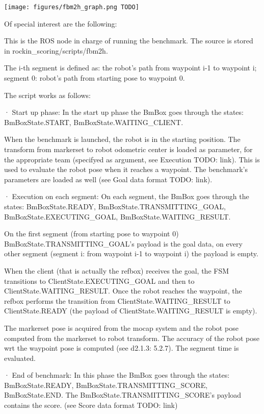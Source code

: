 \documentclass[a4paper]{article}
\begin{document}
\texttt{[image: figures/fbm2h\_graph.png TODO]}

Of special interest are the following:


This is the ROS node in charge of running the benchmark.
The source is stored in rockin_scoring/scripts/fbm2h.

The i-th segment is defined as: the robot's path from waypoint i-1 to waypoint i; segment 0: robot's path from starting pose to waypoint 0.

The script works as follows:

· Start up phase:
In the start up phase the BmBox goes through the states: BmBoxState.START, BmBoxState.WAITING_CLIENT.

When the benchmark is launched, the robot is in the starting position.
The transform from markerset to robot odometric center is loaded as parameter, for the appropriate team (specifyed as argument, see Execution TODO: link).
This is used to evaluate the robot pose when it reaches a waypoint.
The benchmark's parameters are loaded as well (see Goal data format TODO: link).

· Execution on each segment:
On each segment, the BmBox goes through the states: BmBoxState.READY, BmBoxState.TRANSMITTING_GOAL, BmBoxState.EXECUTING_GOAL, BmBoxState.WAITING_RESULT.

On the first segment (from starting pose to waypoint 0) BmBoxState.TRANSMITTING_GOAL's payload is the goal data, on every other segment (segment i: from waypoint i-1 to waypoint i) the payload is empty.

When the client (that is actually the refbox) receives the goal, the FSM transitions to ClientState.EXECUTING_GOAL and then to ClientState.WAITING_RESULT.
Once the robot reaches the waypoint, the refbox performs the transition from ClientState.WAITING_RESULT to ClientState.READY (the payload of ClientState.WAITING_RESULT is empty).

The markerset pose is acquired from the mocap system and the robot pose computed from the markerset to robot transform.
The accuracy of the robot pose wrt the waypoint pose is computed (see d2.1.3: 5.2.7).
The segment time is evaluated.

· End of benchmark:
In this phase the BmBox goes through the states: BmBoxState.READY, BmBoxState.TRANSMITTING_SCORE, BmBoxState.END.
The BmBoxState.TRANSMITTING_SCORE's payload contains the score. (see Score data format TODO: link)
\end{document}
